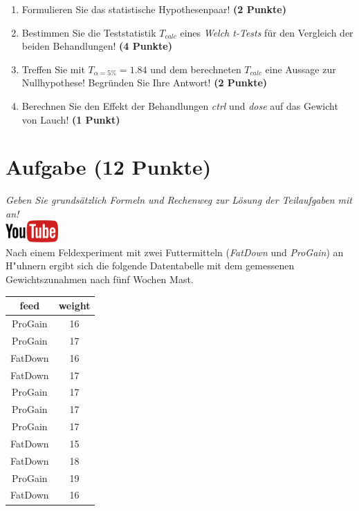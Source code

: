 \documentclass[a4paper, 9pt]{scrartcl}\usepackage[]{graphicx}\usepackage[]{xcolor}
\begin{document}
\begin{enumerate}
  \item Formulieren Sie das statistische Hypothesenpaar! \textbf{(2
      Punkte)}
  \item Bestimmen Sie die Teststatistik $T_{calc}$ eines
    \textit{Welch t-Tests} f{\"u}r den Vergleich der beiden Behandlungen!
    \textbf{(4 Punkte)}
\item Treffen Sie mit $T_{\alpha = 5\%} = 1.84$ und dem
  berechneten $T_{calc}$ eine Aussage zur Nullhypothese! Begr{\"u}nden Sie Ihre
  Antwort!  \textbf{(2 Punkte)}
\item Berechnen Sie den Effekt der Behandlungen \textit{ctrl} und
  \textit{dose} auf das Gewicht von Lauch! \textbf{(1 Punkt)}
\end{enumerate} 
\clearpage

\section{Aufgabe \hfill (12 Punkte)}

\textit{Geben Sie grunds{\"a}tzlich Formeln und Rechenweg zur L{\"o}sung der
  Teilaufgaben mit an!} \\[1Ex]

\hfill\href{https://youtu.be/TbSEOMCQYl4}{\includegraphics[width =
  2cm]{img/youtube}}\\[1Ex]



Nach einem Feldexperiment mit zwei Futtermitteln (\textit{FatDown} und
\textit{ProGain}) an H{"u}hnern ergibt sich die folgende Datentabelle
mit dem gemessenen Gewichtszunahmen nach f{\"u}nf Wochen Mast.

\begin{table}[!h]
\centering
\begin{tabular}{cc}
\toprule
feed & weight\\
\midrule
ProGain & 16\\
ProGain & 17\\
FatDown & 16\\
FatDown & 17\\
ProGain & 17\\
\addlinespace
ProGain & 17\\
ProGain & 17\\
FatDown & 15\\
FatDown & 18\\
ProGain & 19\\
\addlinespace
FatDown & 16\\
\bottomrule
\end{tabular}
\end{table}
\end{document}
